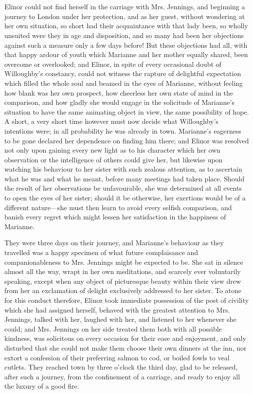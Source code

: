 \chapter{} %

Elinor could not find herself in the carriage with Mrs. Jennings, and beginning a journey to London under her protection, and as her guest, without wondering at her own situation, so short had their acquaintance with that lady been, so wholly unsuited were they in age and disposition, and so many had been her objections against such a measure only a few days before! But these objections had all, with that happy ardour of youth which Marianne and her mother equally shared, been overcome or overlooked; and Elinor, in spite of every occasional doubt of Willoughby's constancy, could not witness the rapture of delightful expectation which filled the whole soul and beamed in the eyes of Marianne, without feeling how blank was her own prospect, how cheerless her own state of mind in the comparison, and how gladly she would engage in the solicitude of Marianne's situation to have the same animating object in view, the same possibility of hope. A short, a very short time however must now decide what Willoughby's intentions were; in all probability he was already in town. Marianne's eagerness to be gone declared her dependence on finding him there; and Elinor was resolved not only upon gaining every new light as to his character which her own observation or the intelligence of others could give her, but likewise upon watching his behaviour to her sister with such zealous attention, as to ascertain what he was and what he meant, before many meetings had taken place. Should the result of her observations be unfavourable, she was determined at all events to open the eyes of her sister; should it be otherwise, her exertions would be of a different nature---she must then learn to avoid every selfish comparison, and banish every regret which might lessen her satisfaction in the happiness of Marianne.

They were three days on their journey, and Marianne's behaviour as they travelled was a happy specimen of what future complaisance and companionableness to Mrs. Jennings might be expected to be. She sat in silence almost all the way, wrapt in her own meditations, and scarcely ever voluntarily speaking, except when any object of picturesque beauty within their view drew from her an exclamation of delight exclusively addressed to her sister. To atone for this conduct therefore, Elinor took immediate possession of the post of civility which she had assigned herself, behaved with the greatest attention to Mrs. Jennings, talked with her, laughed with her, and listened to her whenever she could; and Mrs. Jennings on her side treated them both with all possible kindness, was solicitous on every occasion for their ease and enjoyment, and only disturbed that she could not make them choose their own dinners at the inn, nor extort a confession of their preferring salmon to cod, or boiled fowls to veal cutlets. They reached town by three o'clock the third day, glad to be released, after such a journey, from the confinement of a carriage, and ready to enjoy all the luxury of a good fire.

